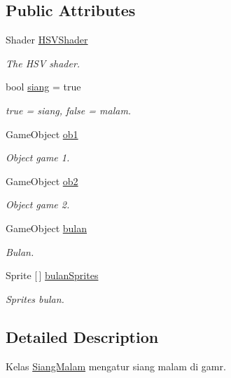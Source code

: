 \subsection*{Public Attributes}
\begin{DoxyCompactItemize}
\item 
Shader \hyperlink{class_siang_malam_a0178556607a805c0d69f623512bb1bf5}{H\+S\+V\+Shader}
\begin{DoxyCompactList}\small\item\em The H\+SV shader. \end{DoxyCompactList}\item 
bool \hyperlink{class_siang_malam_af85d640c6eebc35947063e0df9595794}{siang} = true
\begin{DoxyCompactList}\small\item\em true = siang, false = malam. \end{DoxyCompactList}\item 
Game\+Object \hyperlink{class_siang_malam_a28d5bb8091f1f0160959fce37bdafccd}{ob1}
\begin{DoxyCompactList}\small\item\em Object game 1. \end{DoxyCompactList}\item 
Game\+Object \hyperlink{class_siang_malam_ac903e5559288c82b9767674461899742}{ob2}
\begin{DoxyCompactList}\small\item\em Object game 2. \end{DoxyCompactList}\item 
Game\+Object \hyperlink{class_siang_malam_a1a1e6645cb6a9e4cfa6d753a5c10cfcf}{bulan}
\begin{DoxyCompactList}\small\item\em Bulan. \end{DoxyCompactList}\item 
Sprite \mbox{[}$\,$\mbox{]} \hyperlink{class_siang_malam_a2d931b869867f22ed03b106d66868354}{bulan\+Sprites}
\begin{DoxyCompactList}\small\item\em Sprites bulan. \end{DoxyCompactList}\end{DoxyCompactItemize}


\subsection{Detailed Description}
Kelas \hyperlink{class_siang_malam}{Siang\+Malam} mengatur siang malam di gamr. 



